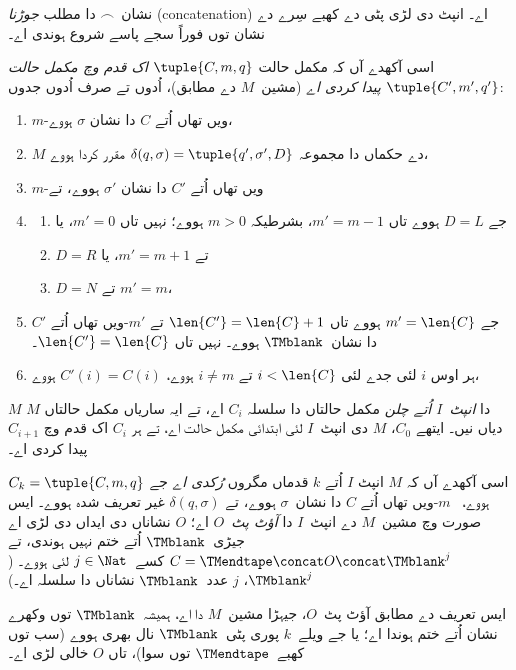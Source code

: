 \documentclass[../../../include/open-logic-section]{subfiles}
\begin{document}
\begin{explain}
نشان~$\frown$ دا مطلب
\emph{جوڑنا} (concatenation)
اے۔
انپٹ دی لڑی پٹی دے
کھبے سِرے دے نشان
توں فوراً سجے پاسے
شروع ہوندی اے۔
\end{explain}

\begin{defn}
اسی آکھدے آں کہ مکمل
حالت $\tuple{C, m, q}$
\emph{اک قدم وچ مکمل حالت
$\tuple{C', m', q'}$ پیدا
کردی اے} (مشین~$M$ دے
مطابق)، اُدوں تے صرف
اُدوں جدوں:
\begin{enumerate}
\item $m$-ویں تھاں اُتے $C$ دا نشان
  $\sigma$ ہووے،
\item $M$ دے حکماں دا
  مجموعہ $\delta(q, \sigma) =
  \tuple{q', \sigma', D}$
  مقرر کردا ہووے،
\item $m$-ویں تھاں اُتے $C'$ دا
  نشان $\sigma'$ ہووے، تے
\item
\begin{enumerate}
\item جے $D = L$ ہووے تاں
  $m' = m - 1$، بشرطیکہ
  $m>0$ ہووے؛ نہیں
  تاں $m'=0$، یا
\item $D = R$ تے $m' = m + 1$، یا
\item $D = N$ تے $m' = m$،
\end{enumerate}
\item جے $m' = \len{C}$
  ہووے تاں $\len{C'} = \len{C} + 1$
  تے $m'$-ویں تھاں اُتے $C'$ دا
  نشان~$\TMblank$ ہووے۔
  نہیں تاں $\len{C'}=\len{C}$۔
\item ہر اوس $i$ لئی
  جدے لئی $i < \len{C}$
  تے $i \neq m$ ہووے،
  $C'(i) = C(i)$ ہووے،
\end{enumerate}
\end{defn}

\begin{defn}
$M$ دا \emph{انپٹ~$I$
اُتے چلن} مکمل حالتاں
دا سلسلہ $C_i$ اے،
تے ایہ ساریاں مکمل حالتاں $M$ دیاں نیں۔
ایتھے $C_0$، $M$ دی
انپٹ~$I$ لئی ابتدائی مکمل
حالت اے، تے ہر $C_i$
اک قدم وچ $C_{i+1}$
پیدا کردی اے۔

اسی آکھدے آں کہ $M$
انپٹ $I$ اُتے $k$ قدماں
مگروں \emph{رُکدی اے}
جے $C_k =
\tuple{C, m, q}$ ہووے،
~$m$-ویں تھاں اُتے $C$ دا
نشان~$\sigma$ ہووے، تے
$\delta(q,
\sigma)$ غیر تعریف شدہ
ہووے۔ ایس صورت وچ
مشین~$M$ دے انپٹ~$I$ دا
\emph{آؤٹ پٹ}~$O$ اے؛
$O$ نشاناں دی ایداں دی
لڑی اے جیڑی~$\TMblank$
اُتے ختم نہیں ہوندی،
تے $C = \TMendtape \concat O \concat \TMblank^j$
کسے~$j \in \Nat$
لئی ہووے۔ ($\TMblank^j$،
$j$ عدد~$\TMblank$ نشاناں
دا سلسلہ اے۔)
\end{defn}

\begin{explain}
ایس تعریف دے مطابق
آؤٹ پٹ~$O$، جیہڑا مشین~$M$ دا اے،
ہمیشہ~$\TMblank$ توں
وکھرے نشان اُتے ختم
ہوندا اے؛ یا جے ویلے~$k$
پوری پٹی~$\TMblank$
نال بھری ہووے (سب توں
کھبے~$\TMendtape$
توں سوا)، تاں $O$
خالی لڑی اے۔
\end{explain}
\end{document}
